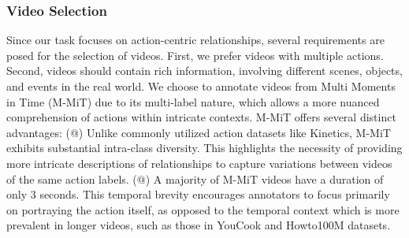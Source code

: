 \documentclass[letterpaper]{article}
\makeatletter
\newcommand{\Rmnum}[1]{\expandafter\@slowromancap\romannumeral #1@}
\makeatother
\begin{document}
\subsubsection{Video Selection}
Since our task focuses on action-centric relationships, several requirements are posed for the selection of videos. 
First, we prefer videos with multiple actions. Second, videos should contain rich information, involving different scenes, objects, and events in the real world.
We choose to annotate videos from Multi Moments in Time (M-MiT) \cite{9609554} due to its multi-label nature, which allows a more nuanced comprehension of actions within intricate contexts.
M-MiT offers several distinct advantages: 
(\Rmnum{1}) Unlike commonly utilized action datasets like Kinetics, M-MiT exhibits substantial intra-class diversity. This highlights the necessity of providing more intricate descriptions of relationships to capture variations between videos of the same action labels.
(\Rmnum{2}) A majority of M-MiT videos have a duration of only 3 seconds. This temporal brevity encourages annotators to focus primarily on portraying the action itself, as opposed to the temporal context which is more prevalent in longer videos, such as those in YouCook and Howto100M datasets.
\end{document}
